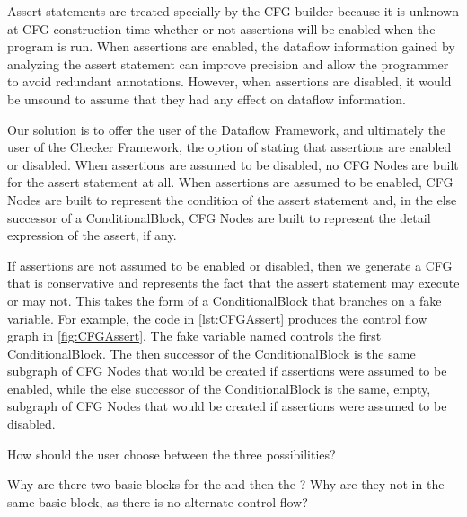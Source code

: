 Assert statements are treated specially by the CFG builder because it
is unknown at CFG construction time whether or not assertions will be
enabled when the program is run.  When assertions are enabled, the
dataflow information gained by analyzing the assert statement can
improve precision and allow the programmer to avoid redundant
annotations.  However, when assertions are disabled, it would be
unsound to assume that they had any effect on dataflow information.

Our solution is to offer the user of the Dataflow Framework, and
ultimately the user of the Checker Framework, the option of stating that
assertions are enabled or disabled.  When assertions are assumed to be
disabled, no CFG Nodes are built for the assert statement at all.
When assertions are assumed to be enabled, CFG Nodes are built to
represent the condition of the assert statement and, in the else
successor of a ConditionalBlock, CFG Nodes are built to represent the
detail expression of the assert, if any.

If assertions are not assumed to be enabled or disabled, then we
generate a CFG that is conservative and represents the fact that the
assert statement may execute or may not.  This takes the form of a
ConditionalBlock that branches on a fake variable.  For example, the
code in \autoref{lst:CFGAssert} produces the control flow graph in
\autoref{fig:CFGAssert}.  The fake variable named
 controls the first ConditionalBlock.
The then successor of the ConditionalBlock is the same subgraph of CFG
Nodes that would be created if assertions were assumed to be enabled,
while the else successor of the ConditionalBlock is the same, empty,
subgraph of CFG Nodes that would be created if assertions were assumed
to be disabled.


\begin{workinprogress}
How should the user choose between the three possibilities?
\end{workinprogress}

\begin{workinprogress}
Why are there two basic blocks for the  and then
the ? Why are they not in the same basic block, as there
is no alternate control flow?
\end{workinprogress}

